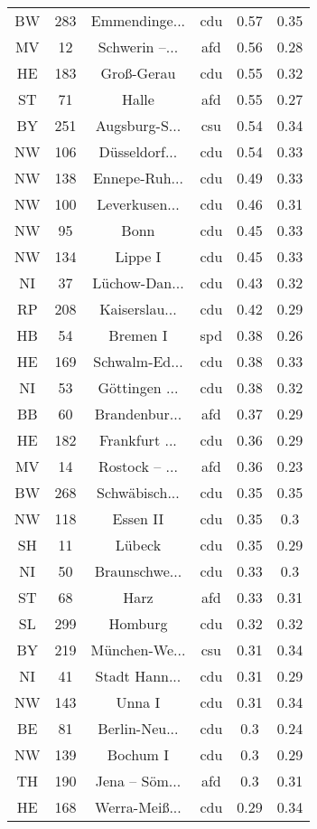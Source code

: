 \begin{table}[!htbp]
\begin{tabular}{@{\extracolsep{5pt}} cccccc}
BW & 283 & Emmendinge... & cdu & 0.57 & 0.35 \\ 
MV & 12 & Schwerin –... & afd & 0.56 & 0.28 \\ 
HE & 183 & Groß-Gerau & cdu & 0.55 & 0.32 \\ 
ST & 71 & Halle & afd & 0.55 & 0.27 \\ 
BY & 251 & Augsburg-S... & csu & 0.54 & 0.34 \\ 
NW & 106 & Düsseldorf... & cdu & 0.54 & 0.33 \\ 
NW & 138 & Ennepe-Ruh... & cdu & 0.49 & 0.33 \\ 
NW & 100 & Leverkusen... & cdu & 0.46 & 0.31 \\ 
NW & 95 & Bonn & cdu & 0.45 & 0.33 \\ 
NW & 134 & Lippe I & cdu & 0.45 & 0.33 \\ 
NI & 37 & Lüchow-Dan... & cdu & 0.43 & 0.32 \\ 
RP & 208 & Kaiserslau... & cdu & 0.42 & 0.29 \\ 
HB & 54 & Bremen I & spd & 0.38 & 0.26 \\ 
HE & 169 & Schwalm-Ed... & cdu & 0.38 & 0.33 \\ 
NI & 53 & Göttingen ... & cdu & 0.38 & 0.32 \\ 
BB & 60 & Brandenbur... & afd & 0.37 & 0.29 \\ 
HE & 182 & Frankfurt ... & cdu & 0.36 & 0.29 \\ 
MV & 14 & Rostock – ... & afd & 0.36 & 0.23 \\ 
BW & 268 & Schwäbisch... & cdu & 0.35 & 0.35 \\ 
NW & 118 & Essen II & cdu & 0.35 & 0.3 \\ 
SH & 11 & Lübeck & cdu & 0.35 & 0.29 \\ 
NI & 50 & Braunschwe... & cdu & 0.33 & 0.3 \\ 
ST & 68 & Harz & afd & 0.33 & 0.31 \\ 
SL & 299 & Homburg & cdu & 0.32 & 0.32 \\ 
BY & 219 & München-We... & csu & 0.31 & 0.34 \\ 
NI & 41 & Stadt Hann... & cdu & 0.31 & 0.29 \\ 
NW & 143 & Unna I & cdu & 0.31 & 0.34 \\ 
BE & 81 & Berlin-Neu... & cdu & 0.3 & 0.24 \\ 
NW & 139 & Bochum I & cdu & 0.3 & 0.29 \\ 
TH & 190 & Jena – Söm... & afd & 0.3 & 0.31 \\ 
HE & 168 & Werra-Meiß... & cdu & 0.29 & 0.34 \\ 

\end{tabular}
\end{table}
